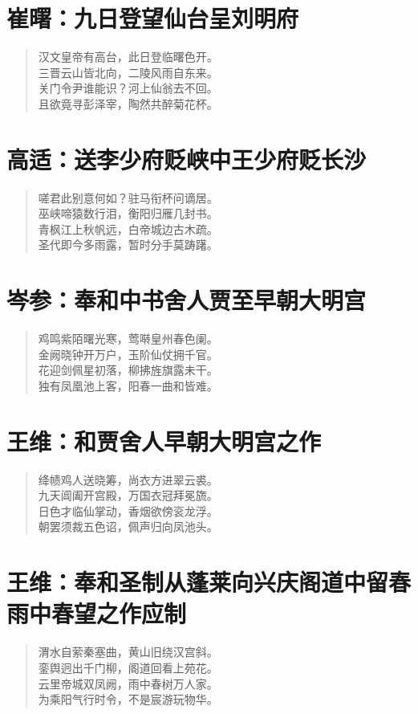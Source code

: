 \documentclass[12pt,oneside]{book}
\newenvironment{shici}{
\begin{verse}
\centering\large\hspace{12pt}}
{\end{verse}}
\begin{document}
\chapter{崔曙：九日登望仙台呈刘明府}
\begin{shici}
汉文皇帝有高台，此日登临曙色开。\\
三晋云山皆北向，二陵风雨自东来。\\
关门令尹谁能识？河上仙翁去不回。\\
且欲竟寻彭泽宰，陶然共醉菊花杯。
\end{shici}

\chapter{高适：送李少府贬峡中王少府贬长沙}
\begin{shici}
嗟君此别意何如？驻马衔杯问谪居。\\
巫峡啼猿数行泪，衡阳归雁几封书。\\
青枫江上秋帆远，白帝城边古木疏。\\
圣代即今多雨露，暂时分手莫踌躇。
\end{shici}

\chapter{岑参：奉和中书舍人贾至早朝大明宫}
\begin{shici}
鸡鸣紫陌曙光寒，莺啭皇州春色阑。\\
金阙晓钟开万户，玉阶仙仗拥千官。\\
花迎剑佩星初落，柳拂旌旗露未干。\\
独有凤凰池上客，阳春一曲和皆难。
\end{shici}

\chapter{王维：和贾舍人早朝大明宫之作}
\begin{shici}
绛帻鸡人送晓筹，尚衣方进翠云裘。\\
九天阊阖开宫殿，万国衣冠拜冕旒。\\
日色才临仙掌动，香烟欲傍衮龙浮。\\
朝罢须裁五色诏，佩声归向凤池头。
\end{shici}

\chapter{王维：奉和圣制从蓬莱向兴庆阁道中留春雨中春望之作应制}
\begin{shici}
渭水自萦秦塞曲，黄山旧绕汉宫斜。\\
銮舆迥出千门柳，阁道回看上苑花。\\
云里帝城双凤阙，雨中春树万人家。\\
为乘阳气行时令，不是宸游玩物华。
\end{shici}
\end{document}
